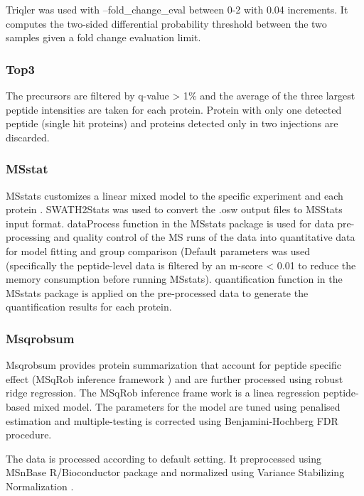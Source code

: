 \documentclass[10pt,letterpaper]{article}
\begin{document}
{Triqler was used with --fold\_change\_eval between 0-2 with 0.04 increments. It computes the two-sided differential probability threshold between the two samples given a fold change evaluation limit. 

\subsubsection*{Top3}
The precursors are filtered by q-value > 1\% and the average of the three largest peptide intensities are taken for each protein. Protein with only one detected peptide (single hit proteins) and proteins detected only in two injections are discarded.

\subsubsection*{MSstat}
 MSstats customizes a linear mixed model to the specific experiment and each protein . SWATH2Stats was used to convert the .osw output files to MSStats input format. dataProcess function in the MSstats package is used for data pre-processing and quality control of the MS runs of the data into quantitative data for model fitting and group comparison (Default parameters was used (specifically the peptide-level data is filtered by an m-score < 0.01 to reduce the memory consumption before running MSstats). quantification function in the MSstats package is applied on the pre-processed data to generate the quantification results for each protein.  

\subsubsection*{Msqrobsum}
Msqrobsum provides protein summarization that account for peptide specific effect (MSqRob inference framework \cite{goeminne2020msqrob}) and are further processed using robust ridge regression. The MSqRob inference frame work is a linea regression peptide-based mixed model. The parameters for the model are tuned using penalised estimation and multiple-testing is corrected using Benjamini-Hochberg FDR procedure. 

The data is processed according to default setting. It preprocessed using MSnBase R/Bioconductor package \cite{gatto2012msnbase} and normalized using Variance Stabilizing Normalization \cite{von2002variance}. 





}
\end{document}
